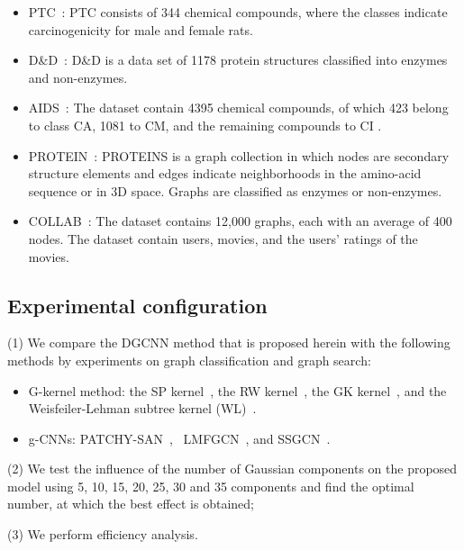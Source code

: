 \documentclass[11pt]{article}
\begin{document}
\begin{itemize}
\item PTC~\cite{Toivonen2003Statistical}: PTC consists of 344 chemical compounds, where the classes indicate carcinogenicity for male and female rats.
\item D\&D~\cite{Wang2002Distinguishing}: D\&D is a data set of 1178 protein structures classified into enzymes and non-enzymes.
\item AIDS~\cite{DBLP:journals/corr/WallachDH15}: The dataset contain 4395 chemical compounds, of which 423 belong to class CA, 1081 to CM, and the remaining compounds to CI .
\item PROTEIN~\cite{Niepert2016Learning_10}: PROTEINS is a graph collection in which nodes are secondary structure elements and edges indicate neighborhoods in the amino-acid sequence or in 3D space. Graphs are classified as enzymes or non-enzymes.
\item COLLAB~\cite{Koren2008Factorization}: The dataset contains 12,000 graphs, each with an average of 400 nodes. The dataset contain users, movies, and the users’ ratings of the movies.
\end{itemize}



\subsection{Experimental configuration}
(1) We compare the DGCNN method that is proposed herein with the following methods by experiments on graph classification and graph search:
\begin{itemize}
\item G-kernel method: the SP kernel~\cite{Borgwardt2006Shortest1}, the RW kernel~\cite{G2003On}, the GK kernel~\cite{Orsini2015Graph}, and the Weisfeiler-Lehman subtree kernel (WL)~\cite{WeisfeilerReduction_26}.
\item g-CNNs: PATCHY-SAN~\cite{Niepert2016Learning_10}, ~LMFGCN~\cite{Duvenaud2015Convolutional}, and SSGCN~\cite{Kipf2016Semi_14}.
\end{itemize}


(2) We test the influence of the number of Gaussian components on the proposed model using 5, 10, 15, 20, 25, 30 and 35 components and find the optimal number, at which the best effect is obtained;


(3) We perform efficiency analysis.
\end{document}
